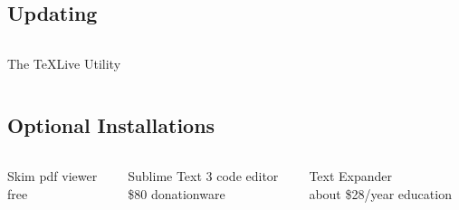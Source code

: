 \documentclass[aspectratio=169,mathserif,8pt,xcolor=table,notes=show]{beamer}
\begin{document}
	\subsection{Updating} %
		\label{sub:updating}
		\begin{frame}[t]{}
			\begin{columns}[T]
				\begin{column}{.2\textwidth}
				The TeXLive Utility\\[.1in]
				\end{column}
				\begin{column}{.8\textwidth}
				\end{column}
			\end{columns}
		\end{frame}
	\subsection{Optional Installations} %
		\label{sub:optional_installations}
		\begin{frame}[t]{}
			\centering
			\begin{columns}[T]
				\begin{column}{.333\textwidth}
					\centering
					Skim pdf viewer\\ free\\[.1in]
				\end{column}
				\begin{column}{.333\textwidth}
					\centering
					Sublime Text 3 code editor\\ \$80 donationware\\[.1in]
				\end{column}
				\begin{column}{.333\textwidth}
					\centering
					Text Expander\\ about \$28/year education\\[.1in]
				\end{column}
			\end{columns}
		\end{frame}
\end{document}
